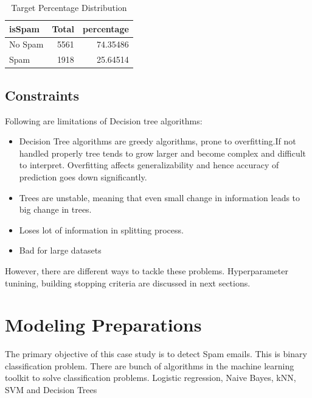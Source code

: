 \documentclass[
]{article}
\providecommand{\tightlist}{%
  \setlength{\itemsep}{0pt}\setlength{\parskip}{0pt}}
\begin{document}
\begin{table}[!h]

\caption{\label{tab:unnamed-chunk-18}Target Percentage Distribution}
\centering
\begin{tabular}[t]{lrr}
\toprule
isSpam & Total & percentage\\
\midrule
No Spam & 5561 & 74.35486\\
Spam & 1918 & 25.64514\\
\bottomrule
\end{tabular}
\end{table}

\hypertarget{constraints}{%
\subsection{Constraints}\label{constraints}}

Following are limitations of Decision tree algorithms:

\begin{itemize}
\tightlist
\item
  Decision Tree algorithms are greedy algorithms, prone to
  overfitting.If not handled properly tree tends to grow larger and
  become complex and difficult to interpret. Overfitting affects
  generalizability and hence accuracy of prediction goes down
  significantly.
\item
  Trees are unstable, meaning that even small change in information
  leads to big change in trees.
\item
  Loses lot of information in splitting process.
\item
  Bad for large datasets
\end{itemize}

However, there are different ways to tackle these problems.
Hyperparameter tunining, building stopping criteria are discussed in
next sections.

\newpage

\hypertarget{modeling-preparations}{%
\section{Modeling Preparations}\label{modeling-preparations}}

The primary objective of this case study is to detect Spam emails. This
is binary classification problem. There are bunch of algorithms in the
machine learning toolkit to solve classification problems. Logistic
regression, Naive Bayes, kNN, SVM and Decision Trees
\end{document}
